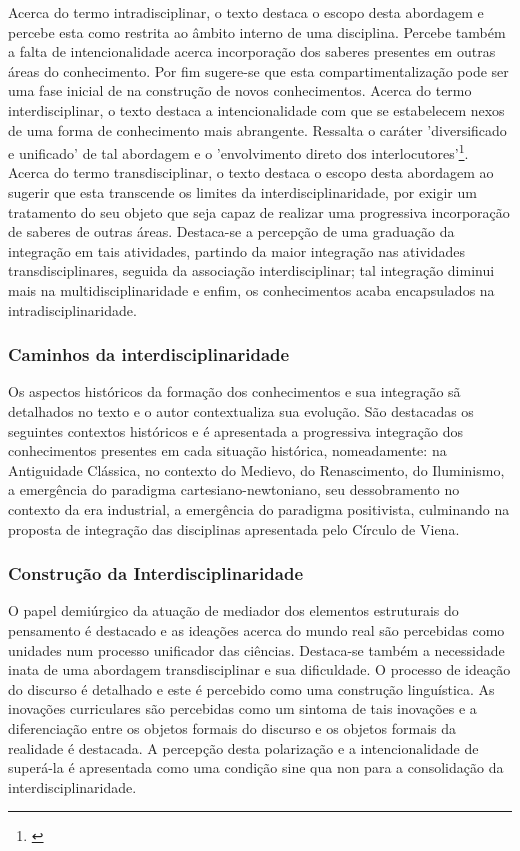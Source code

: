 \documentclass[
   article,       %
   12pt,          %
   oneside,       %
   a4paper,       %
   english,       %
   brazil,           %
   sumario=tradicional
   ]{abntex2}
\begin{document}
Acerca do termo intradisciplinar, o texto destaca o escopo desta abordagem e percebe esta como restrita ao âmbito interno de uma disciplina. Percebe também a falta de intencionalidade acerca incorporação dos saberes presentes em outras áreas do conhecimento. Por fim sugere-se que esta compartimentalização pode ser uma fase inicial de na construção de novos conhecimentos.
Acerca do termo interdisciplinar, o texto destaca a intencionalidade com que se estabelecem nexos de uma forma de conhecimento mais abrangente. Ressalta o caráter 'diversificado e unificado' de tal abordagem e o 'envolvimento direto dos interlocutores'\footnote{\cite[p.58]{consideracoes_Interdisciplinaridade}}. Acerca do termo transdisciplinar, o texto destaca o escopo desta abordagem ao sugerir que esta transcende os limites da interdisciplinaridade, por exigir um tratamento do seu objeto que seja capaz de realizar uma progressiva incorporação de saberes de outras áreas. Destaca-se a percepção de uma graduação da integração em tais atividades, partindo da maior integração nas atividades transdisciplinares, seguida da associação interdisciplinar; tal integração diminui mais na multidisciplinaridade e enfim, os conhecimentos acaba encapsulados na intradisciplinaridade.


\subsubsection{Caminhos da interdisciplinaridade}

Os aspectos históricos da formação dos conhecimentos e sua integração sã detalhados no texto e o autor contextualiza sua evolução. São destacadas os seguintes contextos históricos e é apresentada a progressiva integração dos conhecimentos presentes em cada situação histórica, nomeadamente: na Antiguidade Clássica, no contexto do Medievo,  do Renascimento, do Iluminismo, a emergência do paradigma cartesiano-newtoniano, seu dessobramento no contexto da era industrial, a emergência do paradigma positivista, culminando na proposta de integração das disciplinas apresentada pelo Círculo de Viena.


\subsubsection{Construção da Interdisciplinaridade}

O papel demiúrgico da atuação de mediador dos elementos estruturais do pensamento é destacado e as ideações acerca do mundo real são percebidas como unidades num processo unificador das ciências. Destaca-se também a necessidade inata de uma abordagem transdisciplinar e sua dificuldade. O processo de ideação do discurso é detalhado e este é percebido como uma construção linguística. As inovações curriculares são percebidas como um sintoma de tais inovações e a diferenciação entre os objetos formais do discurso e os objetos formais da realidade é destacada. A percepção desta polarização e a intencionalidade de superá-la é apresentada como uma condição sine qua non para a consolidação da interdisciplinaridade.
\end{document}
